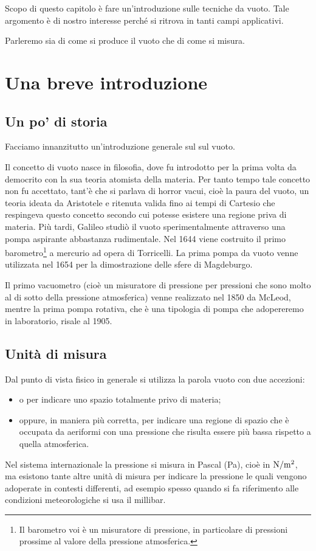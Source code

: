 Scopo di questo capitolo è fare un'introduzione sulle tecniche da vuoto. Tale argomento è di nostro interesse perché si ritrova in tanti campi applicativi.

Parleremo sia di come si produce il vuoto che di come si misura.

\section{Una breve introduzione}

\subsection{Un po' di storia}
Facciamo innanzitutto un'introduzione generale sul sul vuoto.

Il concetto di vuoto nasce in filosofia, dove fu introdotto per la prima volta da democrito con la sua teoria atomista della materia. Per tanto tempo tale concetto non fu accettato, tant'è che si parlava di horror vacui, cioè la paura del vuoto, un teoria ideata da Aristotele e ritenuta valida fino ai tempi di Cartesio che respingeva questo concetto secondo cui potesse esistere una regione priva di materia. Più tardi, Galileo studiò il vuoto sperimentalmente attraverso una pompa aspirante abbastanza rudimentale. Nel 1644 viene costruito il primo barometro\footnote{Il barometro voi è un misuratore di pressione, in particolare di pressioni prossime al valore della pressione atmosferica.} a mercurio ad opera di Torricelli. La prima pompa da vuoto venne utilizzata nel 1654 per la dimostrazione delle sfere di Magdeburgo.

Il primo vacuometro (cioè un misuratore di pressione per pressioni che sono molto al di sotto della pressione atmosferica) venne realizzato nel 1850 da McLeod, mentre la prima pompa rotativa, che è una tipologia di pompa che adopereremo in laboratorio, risale al 1905.

\subsection{Unità di misura}
Dal punto di vista fisico in generale si utilizza la parola vuoto con due accezioni:
\begin{itemize}[leftmargin=0.5cm]
   \item o per indicare uno spazio totalmente privo di materia;
   \item oppure, in maniera più corretta, per indicare una regione di spazio che è occupata da aeriformi con una pressione che risulta essere più bassa rispetto a quella atmosferica.
\end{itemize}
Nel sistema internazionale la pressione si misura in Pascal (Pa), cioè in $\rm N/m^2$, ma esistono tante altre unità di misura per indicare la pressione le quali vengono adoperate in contesti differenti, ad esempio spesso quando si fa riferimento alle condizioni meteorologiche si usa il millibar.

